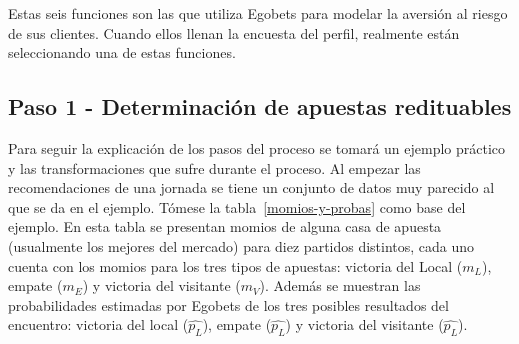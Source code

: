 Estas seis funciones son las que utiliza Egobets para modelar la aversión al riesgo de sus clientes. Cuando ellos llenan la encuesta del perfil, realmente están seleccionando una de estas funciones.


\subsection{Paso 1 - Determinación de apuestas redituables}
\label{sec:paso-1}


Para seguir la explicación de los pasos del proceso se tomará un ejemplo práctico y las transformaciones que sufre durante el proceso. Al empezar las recomendaciones de una jornada se tiene un conjunto de datos muy parecido al que se da en el ejemplo. Tómese la tabla~\ref{momios-y-probas} como base del ejemplo. En esta tabla se presentan momios de alguna casa de apuesta (usualmente los mejores del mercado) para diez partidos distintos, cada uno cuenta con los momios para los tres tipos de apuestas: victoria del Local ($m_L$), empate ($m_E$) y victoria del visitante ($m_V$). Además se muestran las probabilidades estimadas por Egobets de los tres posibles resultados del encuentro: victoria del local ($\hat{p_L}$), empate ($\hat{p_L}$) y victoria del visitante ($\hat{p_L}$).

\begin{table}[ht]
\centering
{}
\caption{Diez partidos con sus respectivos momios y las probabilidades estimadas por Egobets}
\label{momios-y-probas}
\end{table}

